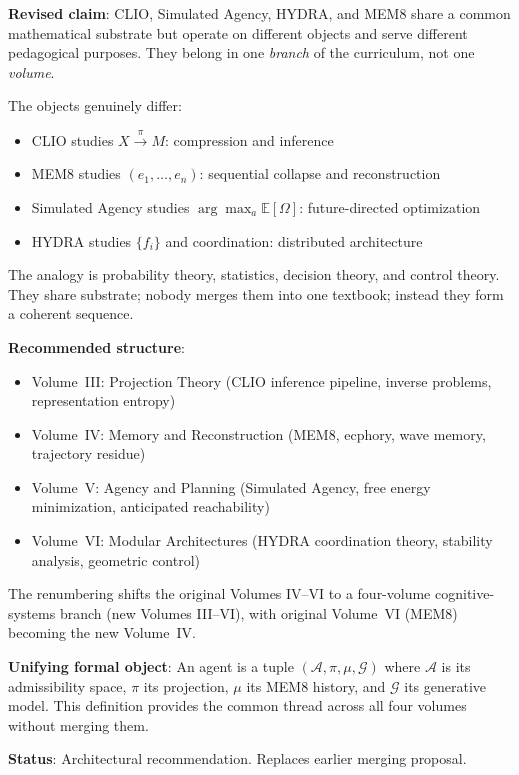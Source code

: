 \documentclass[11pt, a4paper]{article}
\begin{document}
\begin{candbox}
\textbf{Revised claim}: CLIO, Simulated Agency, HYDRA, and MEM\textbar{}8
share a common mathematical substrate but operate on different objects
and serve different pedagogical purposes. They belong in one
\emph{branch} of the curriculum, not one \emph{volume}.

\medskip
The objects genuinely differ:
\begin{itemize}
\item CLIO studies $X \xrightarrow{\pi} M$: compression and inference
\item MEM\textbar{}8 studies $(e_1,\ldots,e_n)$: sequential collapse
  and reconstruction
\item Simulated Agency studies $\arg\max_a \mathbb{E}[\Omega]$:
  future-directed optimization
\item HYDRA studies $\{f_i\}$ and coordination: distributed architecture
\end{itemize}

The analogy is probability theory, statistics, decision theory, and
control theory. They share substrate; nobody merges them into one
textbook; instead they form a coherent sequence.

\medskip
\textbf{Recommended structure}:
\begin{itemize}
\item Volume~III: Projection Theory (CLIO inference pipeline, inverse
  problems, representation entropy)
\item Volume~IV: Memory and Reconstruction (MEM\textbar{}8, ecphory,
  wave memory, trajectory residue)
\item Volume~V: Agency and Planning (Simulated Agency, free energy
  minimization, anticipated reachability)
\item Volume~VI: Modular Architectures (HYDRA coordination theory,
  stability analysis, geometric control)
\end{itemize}

The renumbering shifts the original Volumes IV--VI to a four-volume
cognitive-systems branch (new Volumes III--VI), with original Volume~VI
(MEM\textbar{}8) becoming the new Volume~IV.

\medskip
\textbf{Unifying formal object}: An agent is a tuple
$(\mathcal{A}, \pi, \mu, \mathcal{G})$ where $\mathcal{A}$ is its
admissibility space, $\pi$ its projection, $\mu$ its MEM\textbar{}8
history, and $\mathcal{G}$ its generative model. This definition
provides the common thread across all four volumes without merging them.

\medskip
\textbf{Status}: Architectural recommendation. Replaces earlier
merging proposal.
\end{candbox}
\end{document}

